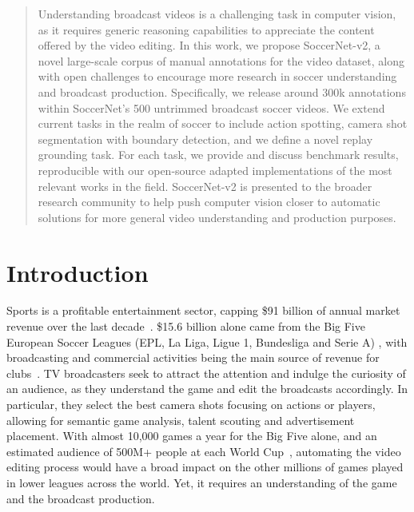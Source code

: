 \documentclass[final]{cvsports}
\begin{document}
\vspace{-1cm}

\begin{abstract}
Understanding broadcast videos is a challenging task in computer vision, as it requires generic reasoning capabilities to appreciate the content offered by the video editing. 
In this work, we propose SoccerNet-v2, a novel large-scale corpus of manual annotations for the \SoccerNet video dataset, along with open challenges to encourage more research in soccer understanding and broadcast production.
Specifically, we release around 300k annotations within SoccerNet's 500 untrimmed broadcast soccer videos. We extend current tasks in the realm of soccer to include action spotting, camera shot segmentation with boundary detection, and we define a novel replay grounding task. For each task, we provide and discuss benchmark results, reproducible with our open-source adapted implementations of the most relevant works in the field.
SoccerNet-v2 is presented to the broader research community to help push computer vision closer to automatic solutions for more general video understanding and production purposes.
\end{abstract} 


\section{Introduction}
\label{sec:Intro}





Sports is a profitable entertainment sector, capping \$91 billion of annual market revenue over the last decade~\cite{GlobalSportsMarket}. \$15.6 billion alone came from the Big Five European Soccer Leagues (EPL, La Liga, Ligue 1, Bundesliga and Serie A) \cite{EuropeanFootballMarket,BigFiveMarket1,BigFiveMarket2}, with broadcasting and commercial activities being the main source of revenue for clubs~\cite{BroadcastingRevenue}. 
TV broadcasters seek to attract the attention and indulge the curiosity of an audience, as they understand the game and edit the broadcasts accordingly. In particular, they select the best camera shots focusing on actions or players, allowing for semantic game analysis, talent scouting and advertisement placement. With almost 10,000 games a year for the Big Five alone, and an estimated audience of 500M+ people at each World Cup~\cite{SoccerAudience}, automating the video editing process would have a broad impact on the other millions of games played in lower leagues across the world. Yet, it requires an understanding of the game and the broadcast production.
\end{document}
